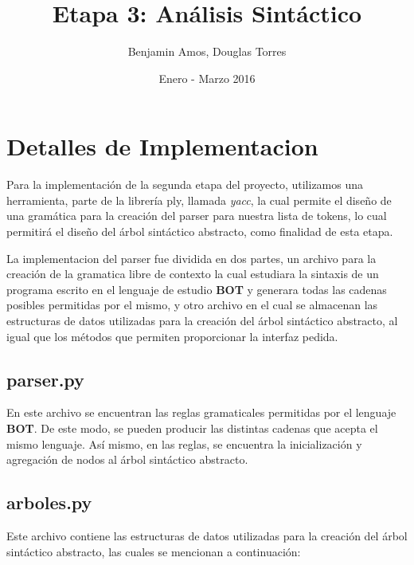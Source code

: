 \documentclass[a4paper, 10pt]{article}
\title{Etapa 3: Análisis Sintáctico}
\date{Enero - Marzo 2016}
\author{Benjamin Amos, Douglas Torres}
\begin{document}
	
	\maketitle
	\newpage
	
	\section{Detalles de Implementacion}
		
		\par	
		\medskip	
		Para la implementación de la segunda etapa del proyecto, utilizamos
		una herramienta, parte de la librería ply, llamada \textit{yacc}, la cual
		permite el diseño de una gramática para la creación del parser para nuestra
		lista de tokens, lo cual permitirá el diseño del árbol sintáctico abstracto, como
		finalidad de esta etapa.
		
		\par
		\medskip
		La implementacion del parser fue dividida en dos partes, un archivo para la creación
		de la gramatica libre de contexto la cual estudiara la sintaxis de un programa
		escrito en el lenguaje de estudio \textbf{BOT} y generara todas las cadenas posibles
		permitidas por el mismo, y otro archivo en el cual se almacenan las estructuras de datos
		utilizadas para la creación del árbol sintáctico abstracto, al igual que los métodos que permiten
		proporcionar la interfaz pedida.
		
		\subsection{parser.py}
		
			\par
			\medskip
			En este archivo se encuentran las reglas gramaticales permitidas por el lenguaje \textbf{BOT}.
			De este modo, se pueden producir las distintas cadenas que acepta el mismo lenguaje. Así mismo, 
			en las reglas, se encuentra la inicialización y agregación de nodos al árbol sintáctico abstracto.
			
		\subsection{arboles.py}
		
			\par
			\medskip
			Este archivo contiene las estructuras de datos utilizadas para la creación del árbol sintáctico 
			abstracto, las cuales se mencionan a continuación:
			
\end{document}
